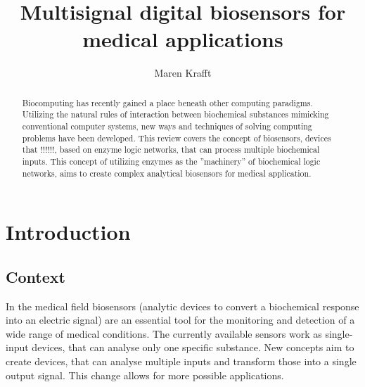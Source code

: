 \documentclass[runningheads]{llncs}
\begin{document}
\title{Multisignal digital biosensors for medical applications}
\author{Maren Krafft}
\maketitle        

      
\begin{abstract}
Biocomputing has recently gained a place beneath other computing paradigms. Utilizing the natural rules of interaction between biochemical substances mimicking conventional computer systems, new ways and techniques of solving computing problems have been developed. This review covers the concept of biosensors, devices that !!!!!!, based on enzyme logic networks, that can process multiple biochemical inputs. This concept of utilizing enzymes as the ''machinery'' of biochemical logic networks, aims to create complex analytical biosensors for medical application.



\end{abstract}


\section{Introduction}

\subsection{Context}

	In the medical field biosensors (analytic devices to convert a biochemical response into an electric signal) are an essential tool for the monitoring and detection of a wide range of medical conditions. The currently available sensors work as single-input devices, that can analyse only one specific substance. New concepts aim to create devices, that can analyse multiple inputs and transform those into a single output signal. This change allows for more possible applications.\\
	
\end{document}

